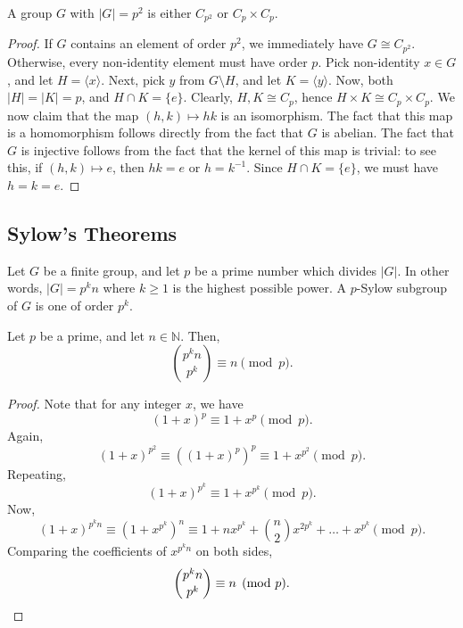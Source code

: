 \documentclass[11pt]{article}
\newcommand{\N}{\mathbb{N}}
\theoremstyle{definition}
\theoremstyle{remark}
\numberwithin{equation}{section}
\begin{document}
    \begin{theorem}
        A group $G$ with $|G| = p^2$ is either $C_{p^2}$ or $C_p \times C_p$.
    \end{theorem}
    \begin{proof}
        If $G$ contains an element of order $p^2$, we immediately have $G \cong
        C_{p^2}$. Otherwise, every non-identity element must have order $p$. Pick
        non-identity $x \in G$, and let $H = \langle x \rangle$. Next, pick $y$ from
        $G \setminus H$, and let $K = \langle y\rangle$. Now, both $|H| = |K| = p$,
        and $H \cap K = \{e\}$. Clearly, $H, K \cong C_p$, hence $H \times K \cong
        C_p \times C_p$. We now claim that the map $(h, k) \mapsto hk$ is an
        isomorphism. The fact that this map is a homomorphism follows directly from
        the fact that $G$ is abelian. The fact that $G$ is injective follows from the
        fact that the kernel of this map is trivial: to see this, if $(h, k) \mapsto
        e$, then $hk = e$ or $h = k^{-1}$. Since $H \cap K = \{e\}$, we must have $h
        = k = e$.
    \end{proof}


    \subsection{Sylow's Theorems}

    \begin{definition}
        Let $G$ be a finite group, and let $p$ be a prime number which divides $|G|$.
        In other words, $|G| = p^k n$ where $k \geq 1$ is the highest possible power.
        A $p$-Sylow subgroup of $G$ is one of order $p^k$.
    \end{definition}

    \begin{lemma}
        Let $p$ be a prime, and let $n \in \N$. Then, \[
            \binom{p^k n}{p^k} \equiv n \pmod{p}.
        \] 
    \end{lemma}
    \begin{proof}
        Note that for any integer $x$, we have \[
            (1 + x)^p \equiv 1 + x^p \pmod{p}.
        \] Again, \[
            (1 + x)^{p^2} \equiv ((1 + x)^p)^p \equiv 1 + x^{p^2} \pmod{p}.
        \] Repeating, \[
            (1 + x)^{p^k} \equiv 1 + x^{p^{k}} \pmod{p}.
        \] Now, \[
            (1 + x)^{p^k n} \equiv (1 + x^{p^k})^n \equiv 1 + nx^{p^k} +
            \binom{n}{2}x^{2p^k} + \dots + x^{p^k} \pmod{p}.
        \] Comparing the coefficients of $x^{p^kn}$ on both sides, \[
            \binom{p^kn}{p^k} \equiv n \pmod{p}. \qedhere
        \] 
    \end{proof}
\end{document}
